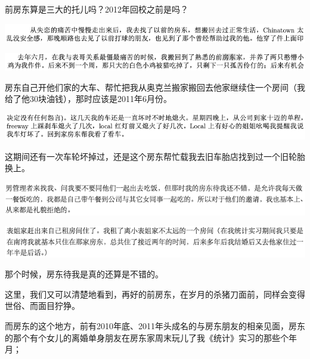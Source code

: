 \documentclass[9pt, b5paper]{article}
\begin{document}
前房东算是三大的托儿吗？2012年回校之前是吗？

\begin{center}
\includegraphics[width=.9\linewidth]{./pic/backups_plans_20210429_205954.png}
\end{center}

\begin{center}
\includegraphics[width=.9\linewidth]{./pic/backups_plans_20210429_210348.png}
\end{center}

房东自己开他们家的大车、帮忙把我从奥克兰搬家搬回去他家继续住一个房间（我给了他30块油钱），那时应该是2011年6月份。 

\begin{center}
\includegraphics[width=.9\linewidth]{./pic/backups_plans_20210429_210205.png}
\end{center}

这期间还有一次车轮坏掉过，还是这个房东帮忙载我去旧车胎店找到过一个旧轮胎换上。 

\begin{center}
\includegraphics[width=.9\linewidth]{./pic/backups_plans_20210429_210543.png}
\end{center}

\begin{center}
\includegraphics[width=.9\linewidth]{./pic/backups_plans_20210429_210638.png}
\end{center}

那个时候，房东待我是真的还算是不错的。

这里，我们又可以清楚地看到，再好的前房东，在岁月的杀猪刀面前，同样会变得世俗、而面目狞狰。

而房东的这个地方，前有2010年底、2011年头成名的与房东朋友的相亲见面，房东的那个有个女儿的离婚单身朋友在房东家周末玩儿了我《统计》实习的那些个年月；
\end{document}
